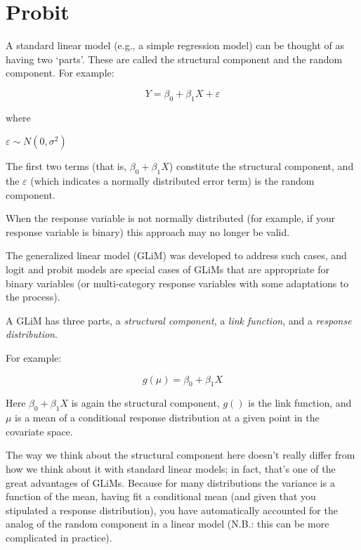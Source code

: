 \documentclass[
]{book}
\begin{document}
\hypertarget{probit}{%
\section{Probit}\label{probit}}

A standard linear model (e.g., a simple regression model) can be thought of as having two `parts'.
These are called the structural component and the random component.
For example:

\[Y=β_0+β_1 X+ε\]

where

\(ε∼N(0,σ^2)\)

The first two terms (that is, \(β_0 + β_1 X\)) constitute the structural component,
and the \(ε\) (which indicates a normally distributed error term) is the random component.

When the response variable is not normally distributed
(for example, if your response variable is binary) this approach may no longer be valid.

The generalized linear model (GLiM) was developed to address such cases,
and logit and probit models are special cases of GLiMs that are appropriate for binary variables
(or multi-category response variables with some adaptations to the process).

A GLiM has three parts, a \emph{structural component}, a \emph{link function}, and a \emph{response distribution}.

For example:

\[g(μ)=β_0+β_1 X\]

Here \(β_0 + β_1 X\) is again the structural component, \(g()\) is the link function,
and \(μ\) is a mean of a conditional response distribution at a given point in the covariate space.

The way we think about the structural component here doesn't really differ from how we think about it
with standard linear models; in fact, that's one of the great advantages of GLiMs.
Because for many distributions the variance is a function of the mean,
having fit a conditional mean (and given that you stipulated a response distribution),
you have automatically accounted for the analog of the random component in a linear model
(N.B.: this can be more complicated in practice).
\end{document}

